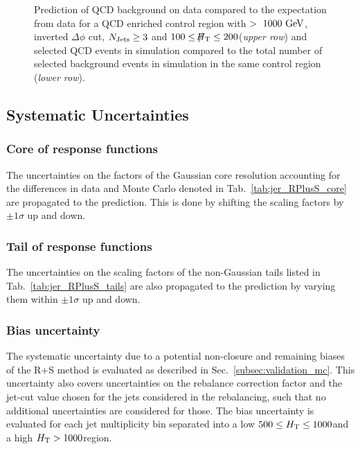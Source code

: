 \begin{figure}[!t]
\begin{tabular}{cc}
  \end{tabular}
  \caption{Prediction of QCD background on data compared to the expectation from data for a QCD enriched control region with \HT$>~1000~\rm{GeV}$, inverted $\Delta \phi$ cut, $N_{\text{Jets}} \geq 3$ and $100 \leq \slash\mkern-12mu{H}_{\text{T}} \leq 200$\gev (\textit{upper row}) and selected QCD events in simulation compared to the total number of selected background events in simulation in the same control region (\textit{lower row}).}
  \label{fig:qcd_rs_dataclosure}
\end{figure}

\subsection{Systematic Uncertainties}
\label{subsec:RA2_syst_unc}
\subsubsection*{Core of response functions} The uncertainties on the factors of the Gaussian core resolution accounting for the differences in data and Monte Carlo denoted in Tab.~\ref{tab:jer_RPlusS_core} are propagated to the prediction. This is done by shifting the scaling factors by $\pm 1\sigma$ up and down. 
\subsubsection*{Tail of response functions} The uncertainties on the scaling factors of the non-Gaussian tails listed in Tab.~\ref{tab:jer_RPlusS_tails} are also propagated to the prediction by varying them within $\pm 1\sigma$ up and down. 
\subsubsection*{Bias uncertainty} The systematic uncertainty due to a potential non-closure and remaining biases of the R+S method is evaluated as described in Sec.~\ref{subsec:validation_mc}. This uncertainty also covers uncertainties on the rebalance correction factor and the jet-\pt cut value chosen for the jets considered in the rebalancing, such that no additional uncertainties are considered for those. The bias uncertainty is evaluated for each jet multiplicity bin separated into a low $ 500 \leq H_{\text{T}} \leq 1000$\gev and a high $H_{\text{T}} > 1000$\gev region.
